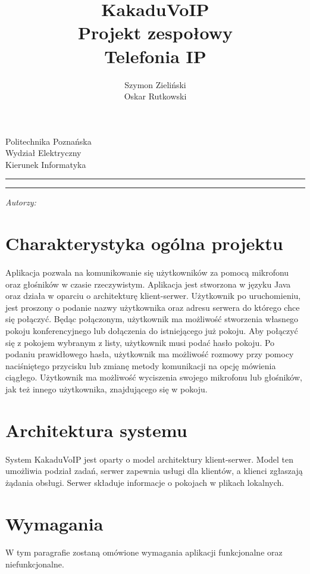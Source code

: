 \documentclass[12pt,a4paper,notitlepage]{report}
\author{\Large{Szymon Zieliński \\ Oskar Rutkowski} }
\title{\textbf{KakaduVoIP} \\[1cm]  Projekt zespołowy  \\ Telefonia IP}
\makeatletter
\newcommand{\linia}{\rule{\linewidth}{0.5mm}}
\renewcommand{\maketitle}{\begin{titlepage}
		
		\vspace*{1cm}
		
		\begin{center}\small
			
			Politechnika Poznańska\\
			
			Wydział Elektryczny\\
			
			Kierunek Informatyka
			
		\end{center}
		
		\vspace{3cm}
		
		\linia
		
		\begin{center}
			
			\LARGE \textsc{\@title}
			
		\end{center}
		
		\linia
		
		\vspace{0.5cm}
		
		\begin{flushright}
			
			\begin{minipage}{5cm}
				
				\textit{ \Large{Autorzy:}}\\
				
				\normalsize{\@author} \par
				
			\end{minipage}
			
		\end{flushright}
		
		\vspace*{\stretch{6}}
		
		\begin{center}
			
			\@date
			
		\end{center}
		
	\end{titlepage}%
	
}
\makeatother
\begin{document}
	
	\maketitle
	\newpage
	\tableofcontents
	\newpage
	
	\section{Charakterystyka ogólna projektu}
	\paragraph*{} Aplikacja pozwala na komunikowanie się użytkowników za pomocą mikrofonu oraz głośników w czasie rzeczywistym. Aplikacja jest stworzona w języku Java oraz działa w oparciu o architekturę klient-serwer. Użytkownik po uruchomieniu, jest proszony o podanie nazwy użytkownika oraz adresu serwera  do którego chce się połączyć. Będąc połączonym, użytkownik ma możliwość stworzenia własnego pokoju konferencyjnego lub dołączenia do istniejącego już pokoju. Aby połączyć się z pokojem wybranym z listy, użytkownik musi podać hasło pokoju. Po podaniu prawidłowego hasła, użytkownik ma możliwość rozmowy przy pomocy naciśniętego przycisku lub zmianę metody komunikacji na opcję mówienia ciągłego. Użytkownik ma możliwość wyciszenia swojego mikrofonu lub głośników, jak też innego użytkownika, znajdującego się w pokoju.
	\section{Architektura systemu}
	\paragraph*{} System KakaduVoIP jest oparty o model architektury klient-serwer. Model ten umożliwia podział zadań, serwer zapewnia usługi dla klientów, a klienci zgłaszają żądania obsługi. Serwer składuje informacje o pokojach w plikach lokalnych.
	\section{Wymagania}
	\paragraph*{} W tym paragrafie zostaną omówione wymagania aplikacji funkcjonalne oraz niefunkcjonalne.
\end{document}
